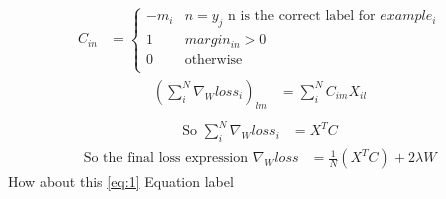 \documentclass[]{article}
\begin{document}
\begin{align}
	C_{in} &= \begin{cases}
	-m_i & n=y_j \text{ n is the correct label for $example_i$}\\
	1 & margin_{in} > 0 \\
	0 & \text{otherwise} \\
	\end{cases}
\end{align}
\begin{align}
	\left(\sum_{i}^{N} \nabla_W loss_i\right)_{lm} &= \sum_{i}^{N} C_{im} X_{il} \\
\end{align}
\begin{align}
	\text{So } \sum_{i}^{N} \nabla_W loss_i &= X^T C
\end{align}
\begin{align}
	\text{So the final loss expression } \nabla_W loss &= \frac{1}{N} \left( X^T C \right) +  2 \lambda W
\end{align} 
How about this \eqref{eq:1} Equation label
\end{document}
